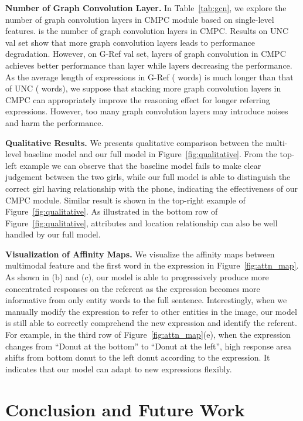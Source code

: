 \documentclass[10pt,twocolumn,letterpaper]{article}
\begin{document}
\vspace{-3mm}
\textbf{Number of Graph Convolution Layer. }In Table~\ref{tab:gcn}, we explore the number of graph convolution layers in CMPC module based on single-level features.  is the number of graph convolution layers in CMPC.
Results on UNC val set show that more graph convolution layers leads to performance degradation.
However, on G-Ref val set,  layers of graph convolution in CMPC achieves better performance than  layer while  layers decreasing the performance. 
As the average length of expressions in G-Ref ( words) is much longer than that of UNC ( words), we suppose that stacking more graph convolution layers in CMPC can appropriately improve the reasoning effect for longer referring expressions. 
However, too many graph convolution layers may introduce noises and harm the performance.

\textbf{Qualitative Results. }We presents qualitative comparison between the multi-level baseline model and our full model 
in Figure~\ref{fig:qualitative}. From the top-left example we can observe that the baseline model fails to make clear judgement 
between the two girls, while our full model is able to distinguish the correct girl having relationship with the phone, 
indicating the effectiveness of our CMPC module. Similar result is shown in the top-right example of 
Figure~\ref{fig:qualitative}. As illustrated in the bottom row of Figure~\ref{fig:qualitative}, attributes and location 
relationship can also be well handled by our full model.

\textbf{Visualization of Affinity Maps. }We visualize the affinity maps between multimodal feature and the first word in the expression in Figure~\ref{fig:attn_map}. As shown in (b) and (c), our model is able to progressively produce more concentrated responses on the referent as the expression becomes more informative from only entity words to the full sentence. Interestingly, when we manually modify the expression to refer to other entities in the image, our model is still able to correctly comprehend the new expression and identify the referent. 
For example, in the third row of Figure~\ref{fig:attn_map}(e), when the expression changes from ``Donut at the bottom'' to ``Donut at the left'', high response area shifts from bottom donut to the left donut according to the expression.
It indicates that our model can adapt to new expressions flexibly.

\vspace{-1mm}
\section{Conclusion and Future Work}
\vspace{-1mm}
\end{document}
